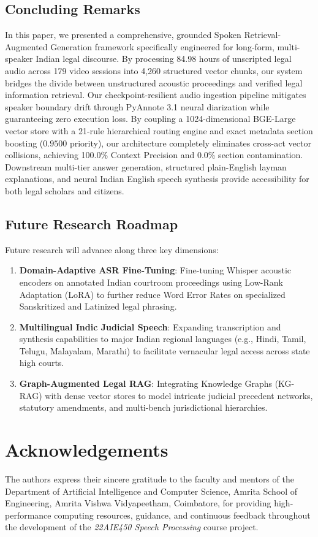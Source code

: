 \documentclass{llncs}
\begin{document}
\subsection{Concluding Remarks}
In this paper, we presented a comprehensive, grounded Spoken Retrieval-Augmented Generation framework specifically engineered for long-form, multi-speaker Indian legal discourse. By processing 84.98 hours of unscripted legal audio across 179 video sessions into 4,260 structured vector chunks, our system bridges the divide between unstructured acoustic proceedings and verified legal information retrieval. Our checkpoint-resilient audio ingestion pipeline mitigates speaker boundary drift through PyAnnote 3.1 neural diarization while guaranteeing zero execution loss. By coupling a 1024-dimensional BGE-Large vector store with a 21-rule hierarchical routing engine and exact metadata section boosting ($0.9500$ priority), our architecture completely eliminates cross-act vector collisions, achieving 100.0\% Context Precision and 0.0\% section contamination. Downstream multi-tier answer generation, structured plain-English layman explanations, and neural Indian English speech synthesis provide accessibility for both legal scholars and citizens.

\subsection{Future Research Roadmap}
Future research will advance along three key dimensions:
\begin{enumerate}
    \item \textbf{Domain-Adaptive ASR Fine-Tuning}: Fine-tuning Whisper acoustic encoders on annotated Indian courtroom proceedings using Low-Rank Adaptation (LoRA) to further reduce Word Error Rates on specialized Sanskritized and Latinized legal phrasing.
    \item \textbf{Multilingual Indic Judicial Speech}: Expanding transcription and synthesis capabilities to major Indian regional languages (e.g., Hindi, Tamil, Telugu, Malayalam, Marathi) to facilitate vernacular legal access across state high courts.
    \item \textbf{Graph-Augmented Legal RAG}: Integrating Knowledge Graphs (KG-RAG) with dense vector stores to model intricate judicial precedent networks, statutory amendments, and multi-bench jurisdictional hierarchies.
\end{enumerate}


\section*{Acknowledgements}
The authors express their sincere gratitude to the faculty and mentors of the Department of Artificial Intelligence and Computer Science, Amrita School of Engineering, Amrita Vishwa Vidyapeetham, Coimbatore, for providing high-performance computing resources, guidance, and continuous feedback throughout the development of the \textit{22AIE450 Speech Processing} course project.
\end{document}
